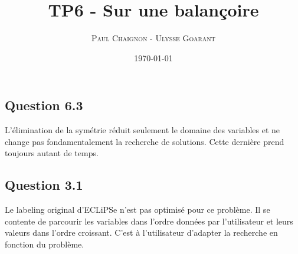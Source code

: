 \documentclass[a4paper,12pt]{article}
\title{TP6 - Sur une balançoire}
\author{\textsc{Paul Chaignon} - \textsc{Ulysse Goarant}}
\date{\today}
\begin{document}
\maketitle


\vspace{2cm}

\subsection*{Question 6.3}

L'élimination de la symétrie réduit seulement le domaine des variables et ne change pas fondamentalement la recherche de solutions. Cette dernière prend toujours autant de temps.


\subsection*{Question 3.1}

Le labeling original d'ECLiPSe n'est pas optimisé pour ce problème. Il se contente de parcourir les variables dans l'ordre données par l'utilisateur et leurs valeurs dans l'ordre croissant. C'est à l'utilisateur d'adapter la recherche en fonction du problème.
\end{document}
